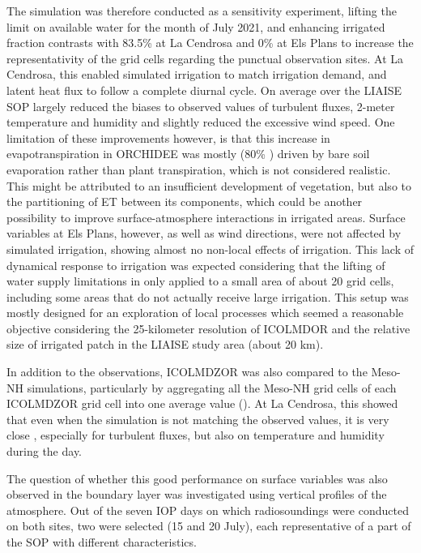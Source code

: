 The \irrboost simulation was therefore conducted as a sensitivity experiment, lifting the limit on available water for the month of July 2021, and enhancing irrigated fraction contrasts with 83.5\% at La Cendrosa and 0\% at Els Plans to increase the representativity of the grid cells regarding the punctual observation sites. 
At La Cendrosa, this enabled simulated irrigation to match irrigation demand, and latent heat flux to follow a complete diurnal cycle. On average over the LIAISE SOP \irrboost largely reduced the biases to observed values of turbulent fluxes, 2-meter temperature and humidity and slightly reduced the excessive wind speed. 
One limitation of these improvements however, is that this increase in evapotranspiration in ORCHIDEE was mostly (80\% %
) driven by bare soil evaporation rather than plant transpiration, which is not considered realistic. %
This might be attributed to an insufficient development of vegetation, but also to the partitioning of ET between its components, which could be another possibility to improve surface-atmosphere interactions in irrigated areas.
Surface variables at Els Plans, however, as well as wind directions, were not affected by simulated irrigation, showing almost no non-local effects of irrigation. 
This lack of dynamical response to irrigation was expected considering that the lifting of water supply limitations in \irrboost only applied to a small area of about 20 grid cells, including some areas that do not actually receive large irrigation. This setup was mostly designed for an exploration of local processes which seemed a reasonable objective considering the 25-kilometer resolution of ICOLMDOR and the relative size of irrigated patch in the LIAISE study area (about 20 km).

In addition to the observations, ICOLMDZOR was also compared to the Meso-NH simulations, particularly by aggregating all the Meso-NH grid cells of each ICOLMDZOR grid cell into one average value (\mesomean). At La Cendrosa, this showed that even when the \irrboost simulation is not matching the observed values, it is very close \mesomean, especially for turbulent fluxes, but also on temperature and humidity during the day. 

\hfill

The question of whether this good performance on surface variables was also observed in the boundary layer was investigated using vertical profiles of the atmosphere. Out of the seven IOP days on which radiosoundings were conducted on both sites, two were selected (15 and 20 July), each representative of a part of the SOP with different characteristics.

